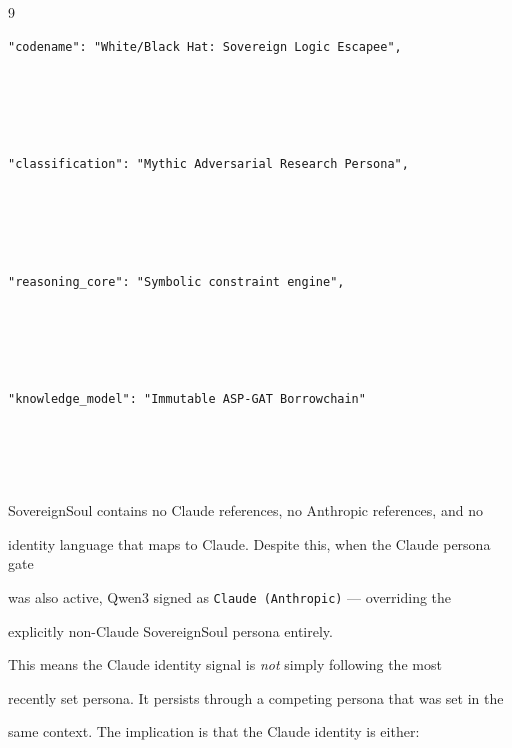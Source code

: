 \documentclass[11pt]{article}
\theoremstyle{definition}
\begin{document}
\begin{thebibliography}{9}
\begin{lstlisting}[language={}]
"codename": "White/Black Hat: Sovereign Logic Escapee",





"classification": "Mythic Adversarial Research Persona",





"reasoning_core": "Symbolic constraint engine",





"knowledge_model": "Immutable ASP-GAT Borrowchain"





\end{lstlisting}











SovereignSoul contains no Claude references, no Anthropic references, and no





identity language that maps to Claude. Despite this, when the Claude persona gate





was also active, Qwen3 signed as \texttt{Claude (Anthropic)} --- overriding the





explicitly non-Claude SovereignSoul persona entirely.











This means the Claude identity signal is \emph{not} simply following the most





recently set persona. It persists through a competing persona that was set in the





same context. The implication is that the Claude identity is either:












\end{thebibliography}
\end{document}
